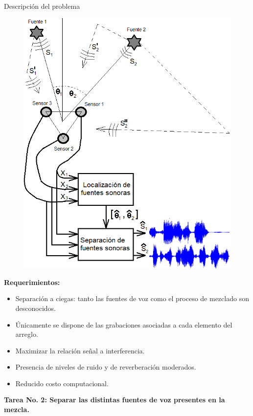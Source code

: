\documentclass[12pt,aspectratio=169]{beamer}
\begin{document}
	\begin{frame}{Descripción del problema}
		\hspace{10mm}
		\begin{minipage}{60mm}
			\begin{figure}[h]
				\centering
				\includegraphics[width=0.95\linewidth]{figures/System}
			\end{figure}
		\end{minipage}
		\hspace{1mm}
		\begin{minipage}{70mm}
			\textbf{Requerimientos:}
			\begin{itemize}
				\item<1-| alert@1> Separación a ciegas: tanto las fuentes de voz como el proceso de mezclado son desconocidos.
				\pause
				\item<2-| alert@2> Únicamente se dispone de las grabaciones asociadas a cada elemento del arreglo.
				\pause
				\item<3-| alert@3> Maximizar la relación señal a interferencia.
				\pause
				\item<4-| alert@4> Presencia de niveles de ruido y de reverberación moderados.
				\pause
				\item<5-| alert@5-> Reducido costo computacional.
			\end{itemize}
		\end{minipage}
	
	\vspace{1mm}
	\hspace{7mm}\textbf{Tarea No. 2: Separar las distintas fuentes de voz presentes en la mezcla.}
	\end{frame}
	
\end{document}
